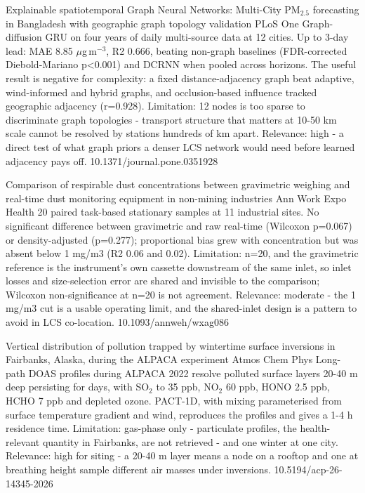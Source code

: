 \documentclass[10pt]{article}
\begin{document}
{Explainable spatiotemporal Graph Neural Networks: Multi-City PM$_{2.5}$ forecasting in Bangladesh with geographic graph topology validation}
{PLoS One}
{Graph-diffusion GRU on four years of daily multi-source data at 12 cities. Up to 3-day lead: MAE 8.85 $\mu$g\,m$^{-3}$, R2 0.666, beating non-graph baselines (FDR-corrected Diebold-Mariano p<0.001) and DCRNN when pooled across horizons. The useful result is negative for complexity: a fixed distance-adjacency graph beat adaptive, wind-informed and hybrid graphs, and occlusion-based influence tracked geographic adjacency (r=0.928). Limitation: 12 nodes is too sparse to discriminate graph topologies - transport structure that matters at 10-50 km scale cannot be resolved by stations hundreds of km apart. Relevance: high - a direct test of what graph priors a denser LCS network would need before learned adjacency pays off.}
{10.1371/journal.pone.0351928}

{Comparison of respirable dust concentrations between gravimetric weighing and real-time dust monitoring equipment in non-mining industries}
{Ann Work Expo Health}
{20 paired task-based stationary samples at 11 industrial sites. No significant difference between gravimetric and raw real-time (Wilcoxon p=0.067) or density-adjusted (p=0.277); proportional bias grew with concentration but was absent below 1 mg/m3 (R2 0.06 and 0.02). Limitation: n=20, and the gravimetric reference is the instrument's own cassette downstream of the same inlet, so inlet losses and size-selection error are shared and invisible to the comparison; Wilcoxon non-significance at n=20 is not agreement. Relevance: moderate - the 1 mg/m3 cut is a usable operating limit, and the shared-inlet design is a pattern to avoid in LCS co-location.}
{10.1093/annweh/wxag086}

{Vertical distribution of pollution trapped by wintertime surface inversions in Fairbanks, Alaska, during the ALPACA experiment}
{Atmos Chem Phys}
{Long-path DOAS profiles during ALPACA 2022 resolve polluted surface layers 20-40 m deep persisting for days, with SO$_2$ to 35 ppb, NO$_2$ 60 ppb, HONO 2.5 ppb, HCHO 7 ppb and depleted ozone. PACT-1D, with mixing parameterised from surface temperature gradient and wind, reproduces the profiles and gives a 1-4 h residence time. Limitation: gas-phase only - particulate profiles, the health-relevant quantity in Fairbanks, are not retrieved - and one winter at one city. Relevance: high for siting - a 20-40 m layer means a node on a rooftop and one at breathing height sample different air masses under inversions.}
{10.5194/acp-26-14345-2026}
\end{document}

